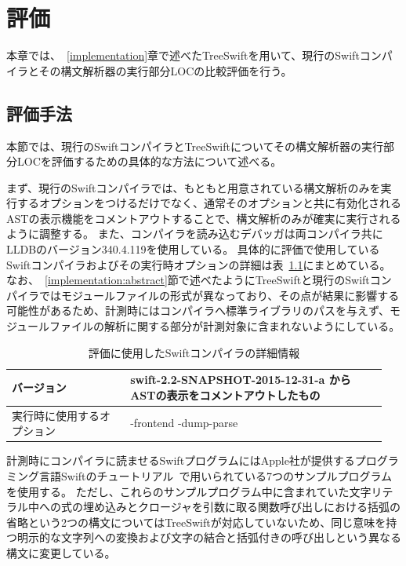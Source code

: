 \chapter{評価}
\label{evaluation}

本章では、~\ref{implementation}章で述べたTreeSwiftを用いて、現行のSwiftコンパイラとその構文解析器の実行部分LOCの比較評価を行う。

\section{評価手法}
\label{evaluation:method}

本節では、現行のSwiftコンパイラとTreeSwiftについてその構文解析器の実行部分LOCを評価するための具体的な方法について述べる。

まず、現行のSwiftコンパイラでは、もともと用意されている構文解析のみを実行するオプションをつけるだけでなく、通常そのオプションと共に有効化されるASTの表示機能をコメントアウトすることで、構文解析のみが確実に実行されるように調整する。
また、コンパイラを読み込むデバッガは両コンパイラ共にLLDBのバージョン340.4.119を使用している。
具体的に評価で使用しているSwiftコンパイラおよびその実行時オプションの詳細は表~\ref{table:swift-exe-option}にまとめている。
なお、~\ref{implementation:abstract}節で述べたようにTreeSwiftと現行のSwiftコンパイラではモジュールファイルの形式が異なっており、その点が結果に影響する可能性があるため、計測時にはコンパイラへ標準ライブラリのパスを与えず、モジュールファイルの解析に関する部分が計測対象に含まれないようにしている。

\begin{table}[!hbtp]
    \begin{center}
        \caption{評価に使用したSwiftコンパイラの詳細情報}
        \begin{tabular}{|p{0.3\linewidth}|p{0.65\linewidth}|}
            \hline
            バージョン & swift-2.2-SNAPSHOT-2015-12-31-a からASTの表示をコメントアウトしたもの\\
            \hline
            実行時に使用するオプション & -frontend -dump-parse\\
            \hline
        \end{tabular}
        \label{table:swift-exe-option}
    \end{center}
\end{table}

計測時にコンパイラに読ませるSwiftプログラムにはApple社が提供するプログラミング言語Swiftのチュートリアル~\cite{swift-tour}で用いられている7つのサンプルプログラムを使用する。
ただし、これらのサンプルプログラム中に含まれていた文字リテラル中への式の埋め込みとクロージャを引数に取る関数呼び出しにおける括弧の省略という2つの構文についてはTreeSwiftが対応していないため、同じ意味を持つ明示的な文字列への変換および文字の結合と括弧付きの呼び出しという異なる構文に変更している。

